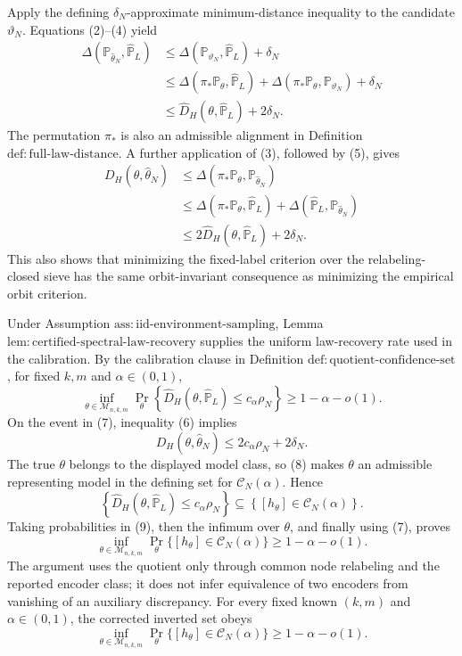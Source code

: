 Apply the defining \(\delta_N\)-approximate minimum-distance inequality to the candidate \(\vartheta_N\).  Equations (2)--(4) yield
\[
\begin{aligned}
 \Delta(\mathbb P_{\widehat\theta_N},\widehat{\mathbb P}_L)
 &\leq \Delta(\mathbb P_{\vartheta_N},\widehat{\mathbb P}_L)+\delta_N\\
 &\leq \Delta(\pi_*\mathbb P_\theta,\widehat{\mathbb P}_L)
       +\Delta(\pi_*\mathbb P_\theta,\mathbb P_{\vartheta_N})+\delta_N\\
 &\leq \widehat D_H(\theta,\widehat{\mathbb P}_L)+2\delta_N.
\end{aligned}
\tag{5}
\]
The permutation \(\pi_*\) is also an admissible alignment in Definition \(\mathrm{def:full\text{-}law\text{-}distance}\).  A further application of (3), followed by (5), gives
\[
\begin{aligned}
 D_H(\theta,\widehat\theta_N)
 &\leq \Delta(\pi_*\mathbb P_\theta,\mathbb P_{\widehat\theta_N})\\
 &\leq \Delta(\pi_*\mathbb P_\theta,\widehat{\mathbb P}_L)
       +\Delta(\widehat{\mathbb P}_L,\mathbb P_{\widehat\theta_N})\\
 &\leq 2\widehat D_H(\theta,\widehat{\mathbb P}_L)+2\delta_N.
\end{aligned}
\tag{6}
\]
This also shows that minimizing the fixed-label criterion over the relabeling-closed sieve has the same orbit-invariant consequence as minimizing the empirical orbit criterion.

Under Assumption \(\mathrm{ass:iid\text{-}environment\text{-}sampling}\), Lemma \(\mathrm{lem:certified\text{-}spectral\text{-}law\text{-}recovery}\) supplies the uniform law-recovery rate used in the calibration.  By the calibration clause in Definition \(\mathrm{def:quotient\text{-}confidence\text{-}set}\), for fixed \(k,m\) and \(\alpha\in(0,1)\),
\[
 \inf_{\theta\in\mathcal M_{n,k,m}}
 \Pr_\theta\!\left\{
   \widehat D_H(\theta,\widehat{\mathbb P}_L)
   \leq c_\alpha\rho_N
 \right\}
 \geq 1-\alpha-o(1).
\tag{7}
\]
On the event in (7), inequality (6) implies
\[
 D_H(\theta,\widehat\theta_N)
 \leq 2c_\alpha\rho_N+2\delta_N.
\tag{8}
\]
The true \(\theta\) belongs to the displayed model class, so (8) makes \(\theta\) an admissible representing model in the defining set for \(\mathcal C_N(\alpha)\).  Hence
\[
 \left\{
   \widehat D_H(\theta,\widehat{\mathbb P}_L)\leq c_\alpha\rho_N
 \right\}
 \subseteq
 \left\{[h_\theta]\in\mathcal C_N(\alpha)\right\}.
\tag{9}
\]
Taking probabilities in (9), then the infimum over \(\theta\), and finally using (7), proves
\[
 \inf_{\theta\in\mathcal M_{n,k,m}}
 \Pr_\theta\{[h_\theta]\in\mathcal C_N(\alpha)\}
 \geq1-\alpha-o(1).
\]
The argument uses the quotient only through common node relabeling and the reported encoder class; it does not infer equivalence of two encoders from vanishing of an auxiliary discrepancy.
For every fixed known \((k,m)\) and \(\alpha\in(0,1)\), the corrected inverted set obeys
\[
\inf_{\theta\in\mathcal M_{n,k,m}}
\Pr_\theta\{[h_\theta]\in\mathcal C_N(\alpha)\}
\ge1-\alpha-o(1).
\]

